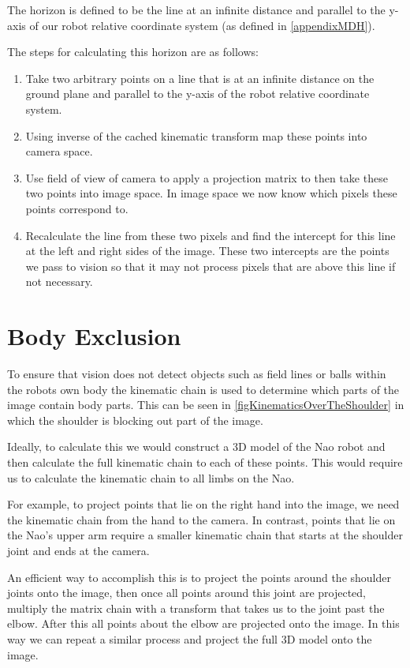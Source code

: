 \documentclass[pdftex,11pt,a4paper]{report}
\begin{document}
The horizon is defined to be the line at an infinite distance and parallel to the y-axis of our robot relative coordinate system (as defined in \autoref{appendixMDH}).  

The steps for calculating this horizon are as follows:

\begin{enumerate}
\item Take two arbitrary points on a line that is at an infinite distance on the ground plane and parallel to the y-axis of the robot relative coordinate system.
\item Using inverse of the cached kinematic transform map these points into camera space.
\item Use field of view of camera to apply a projection matrix to then take these two points into image space. In image space we now know which pixels these points correspond to.
\item Recalculate the line from these two pixels and find the intercept for this line at the left and right sides of the image. These two intercepts are the points we pass to vision so that it may not process pixels that are above this line if not necessary.
\end{enumerate}

\section{Body Exclusion} \label{sectionBodyExclusion}

To ensure that vision does not detect objects such as field lines or balls within the robots own body the kinematic chain is used to determine which parts of the image contain body parts.  This can be seen in \autoref{figKinematicsOverTheShoulder} in which the shoulder is blocking out part of the image.

Ideally, to calculate this we would construct a 3D model of the Nao robot and
then calculate the full kinematic chain to each of these points. This would
require us to calculate the kinematic chain to all limbs on the Nao.

For example, to project points that lie on the right hand into the image, we
need the kinematic chain from the hand to the camera. In contrast, points that
lie on the Nao's upper arm require a smaller kinematic chain that starts at the
shoulder joint and ends at the camera.

An efficient way to accomplish this is to project the points around the shoulder joints onto the image, then once all points around this joint are projected, multiply the matrix chain with a transform that takes us to the joint past the elbow. After this all points about the elbow are projected onto the image. In this way we can repeat a similar process and project the full 3D model onto the image.
\end{document}
